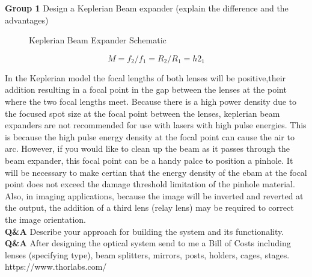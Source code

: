 \documentclass[main.tex]{subfiles}
\begin{document}
\textbf{Group 1} Design a Keplerian Beam expander (explain the difference and the advantages)\\

\begin{figure}\label{fig:1}
\centering{}
\caption{Keplerian Beam Expander Schematic}
\end{figure}

\begin{equation}\label{eq:e1}
M=f_2/f_1= R_2/R_1 = h2_1
\end{equation}

In the Keplerian model the focal lengths of both lenses will be positive,their addition resulting in a focal point in the gap between the lenses at the point where the two focal lengths meet. Because there is a high power density due to the focused spot size at the focal point between the lenses, keplerian beam expanders are not recommended for use with lasers with high pulse energies. This is because the high pulse energy density at the focal point can cause the air to arc. However, if you would like to clean up the beam as it passes through the beam expander, this focal point can be a handy palce to position a pinhole. It will be necessary to make certian that the energy density of the ebam at the focal point does not exceed the damage threshold limitation of the pinhole material. Also, in imaging applications, because the image will be inverted and reverted at the output, the addition of a third lens (relay lens) may be required to correct the image orientation.\\

\textbf{Q&A} Describe your approach for building the system and its functionality.\\

\textbf{Q&A} After designing the optical system send to me a Bill of Costs including lenses (specifying type), beam splitters, mirrors, posts, holders, cages, stages. https://www.thorlabs.com/\\
\end{document}
